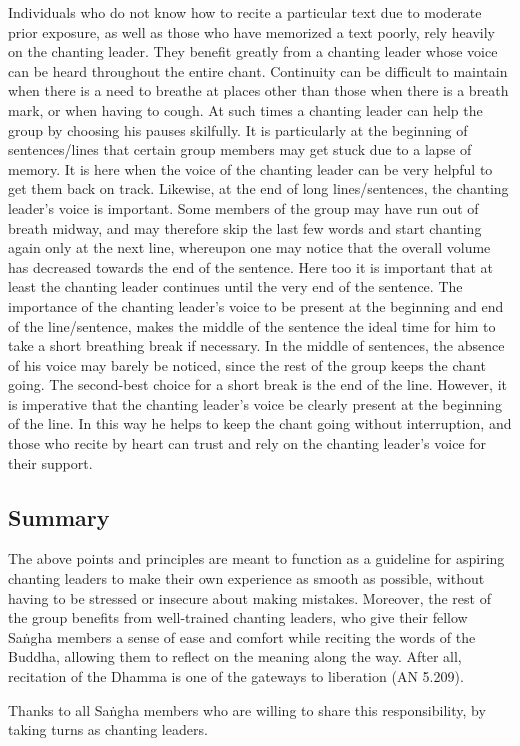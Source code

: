   Individuals who do not know how to recite a particular text due to moderate prior exposure, as well as those who have memorized a text poorly, rely heavily on the chanting leader. They benefit greatly from a chanting leader whose voice can be heard throughout the entire chant. Continuity can be difficult to maintain when there is a need to breathe at places other than those when there is a breath mark, or when having to cough. At such times a chanting leader can help the group by choosing his pauses skilfully. It is particularly at the beginning of sentences/lines that certain group members may get stuck due to a lapse of memory. It is here when the voice of the chanting leader can be very helpful to get them back on track. Likewise, at the end of long lines/sentences, the chanting leader's voice is important. Some members of the group may have run out of breath midway, and may therefore skip the last few words and start chanting again only at the next line, whereupon one may notice that the overall volume has decreased towards the end of the sentence. Here too it is important that at least the chanting leader continues until the very end of the sentence. The importance of the chanting leader's voice to be present at the beginning and end of the line/sentence, makes the middle of the sentence the ideal time for him to take a short breathing break if necessary. In the middle of sentences, the absence of his voice may barely be noticed, since the rest of the group keeps the chant going. The second-best choice for a short break is the end of the line. However, it is imperative that the chanting leader's voice be clearly present at the beginning of the line. In this way he helps to keep the chant going without interruption, and those who recite by heart can trust and rely on the chanting leader's voice for their support.

\subsection*{Summary}

  The above points and principles are meant to function as a guideline for aspiring chanting leaders to make their own experience as smooth as possible, without having to be stressed or insecure about making mistakes. Moreover, the rest of the group benefits from well-trained chanting leaders, who give their fellow Saṅgha members a sense of ease and comfort while reciting the words of the Buddha, allowing them to reflect on the meaning along the way. After all, recitation of the Dhamma is one of the gateways to liberation (AN 5.209).

  Thanks to all Saṅgha members who are willing to share this responsibility, by taking turns as chanting leaders.


